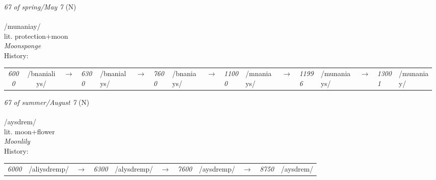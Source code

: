 \vspace{15pt}
\begin{nopagebreak}
 \textit{67 of spring/May 7} (N)\\
\\
\noindent /munan{\textprimstress}iay/\\
\noindent lit. protection+moon\\
\noindent \textit{Moonsponge}\\


\noindent History:

\vspace{-0pt}
\hspace{40pt}
\begin{tabular}{ccc}
\textit{6000} & /bnanialiys/&$\rightarrow$ & \textit{6300} & /bnanialys/&$\rightarrow$ & \textit{7600} & /bnaniays/&$\rightarrow$ & \textit{11000} & /mnaniays/&$\rightarrow$ & \textit{11996} & /munaniays/&$\rightarrow$ & \textit{13001} & /munaniay/& \\
\end{tabular}

\vspace{20pt}\hline

\end{nopagebreak}
\filbreak



\vspace{15pt}
\begin{nopagebreak}
 \textit{67 of summer/August 7} (N)\\
\\
\noindent /{\textprimstress}aysdrem/\\
\noindent lit. moon+flower\\
\noindent \textit{Moonlily}\\


\noindent History:

\vspace{-0pt}
\hspace{40pt}
\begin{tabular}{ccc}
\textit{6000} & /aliysdremp/&$\rightarrow$ & \textit{6300} & /alysdremp/&$\rightarrow$ & \textit{7600} & /aysdremp/&$\rightarrow$ & \textit{8750} & /aysdrem/& \\
\end{tabular}

\vspace{20pt}\hline

\end{nopagebreak}
\filbreak



